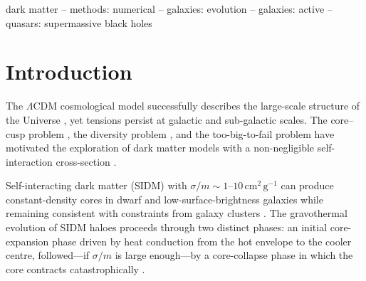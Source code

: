 \documentclass[fleqn,usenatbib]{mnras}
\newcommand{\code}[1]{\texttt{#1}}
\newcommand{\sigmam}{\sigma/m}
\newcommand{\MBH}{M_{\rm BH}}
\newcommand{\vdisp}{\sigma_v}
\newcommand{\LCDM}{\Lambda\mathrm{CDM}}
\begin{document}
\begin{abstract}
The resulting $\MBH$--$\vdisp$ relation is flattened at the low-mass
end in SIDM relative to CDM, consistent with recent observational
hints from dwarf AGN surveys.  The non-elastic variants break
further degeneracies: \code{dSIDM} accelerates core collapse,
\code{iSIDM} (exothermic) heats the centre and suppresses collapse
entirely, while \code{iSIDM-endo} and \code{IDM} bracket the range
of weakly modified CDM-like evolution.  Our results demonstrate that
SMBH growth cannot be modelled independently of the dark matter
microphysics, and that AGN feedback in turn regulates the
gravothermal evolution of SIDM haloes, breaking the degeneracy
between $\sigmam$ and halo concentration.
\end{abstract}

\begin{keywords}
dark matter -- methods: numerical -- galaxies: evolution --
galaxies: active -- quasars: supermassive black holes
\end{keywords}

\section{Introduction}
\label{sec:intro}

The $\LCDM$ cosmological model successfully describes the large-scale
structure of the Universe \citep{Planck2020}, yet tensions persist at
galactic and sub-galactic scales.  The core--cusp problem
\citep{deBlok2010,Oh2015}, the diversity problem
\citep{Oman2015,Santos-Santos2020}, and the too-big-to-fail problem
\citep{Boylan-Kolchin2011} have motivated the exploration of dark
matter models with a non-negligible self-interaction cross-section
\citep{Spergel2000}.

Self-interacting dark matter (SIDM) with $\sigmam \sim
1$--$10\,\mathrm{cm^2\,g^{-1}}$ can produce constant-density cores in
dwarf and low-surface-brightness galaxies while remaining consistent
with constraints from galaxy clusters
\citep{Tulin2018,Adhikari2022}.  The gravothermal evolution of SIDM
haloes proceeds through two distinct phases: an initial core-expansion
phase driven by heat conduction from the hot envelope to the cooler
centre, followed---if $\sigmam$ is large enough---by a core-collapse
phase in which the core contracts catastrophically
\citep{Balberg2002,Essig2019,Nishikawa2020}.
\end{document}
